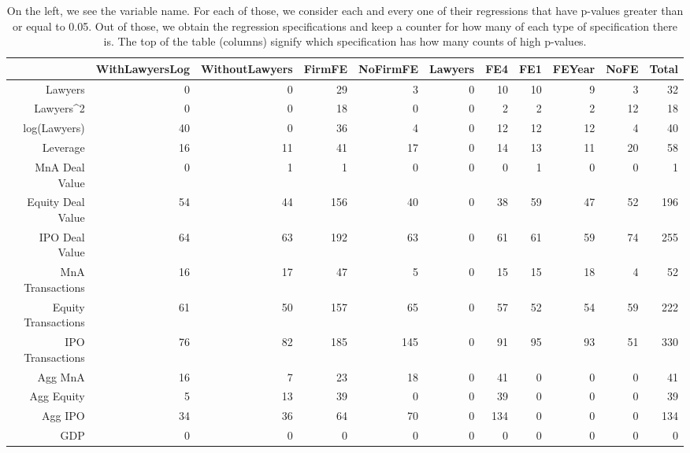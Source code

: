 \begin{table}[ht]
\centering
\begin{tabular}{rrrrrrrrrrr}
  \hline
 & WithLawyersLog & WithoutLawyers & FirmFE & NoFirmFE & Lawyers & FE4 & FE1 & FEYear & NoFE & \textbf{Total} \\ 
  \hline
Lawyers & 0 & 0 & 29 & 3 & 0 & 10 & 10 & 9 & 3 & 32 \\ 
  Lawyers^2 & 0 & 0 & 18 & 0 & 0 & 2 & 2 & 2 & 12 & 18 \\ 
  log(Lawyers) & 40 & 0 & 36 & 4 & 0 & 12 & 12 & 12 & 4 & 40 \\ 
  Leverage & 16 & 11 & 41 & 17 & 0 & 14 & 13 & 11 & 20 & 58 \\ 
  MnA Deal Value & 0 & 1 & 1 & 0 & 0 & 0 & 1 & 0 & 0 & 1 \\ 
  Equity Deal Value & 54 & 44 & 156 & 40 & 0 & 38 & 59 & 47 & 52 & 196 \\ 
  IPO Deal Value & 64 & 63 & 192 & 63 & 0 & 61 & 61 & 59 & 74 & 255 \\ 
  MnA Transactions & 16 & 17 & 47 & 5 & 0 & 15 & 15 & 18 & 4 & 52 \\ 
  Equity Transactions & 61 & 50 & 157 & 65 & 0 & 57 & 52 & 54 & 59 & 222 \\ 
  IPO Transactions & 76 & 82 & 185 & 145 & 0 & 91 & 95 & 93 & 51 & 330 \\ 
  Agg MnA & 16 & 7 & 23 & 18 & 0 & 41 & 0 & 0 & 0 & 41 \\ 
  Agg Equity & 5 & 13 & 39 & 0 & 0 & 39 & 0 & 0 & 0 & 39 \\ 
  Agg IPO & 34 & 36 & 64 & 70 & 0 & 134 & 0 & 0 & 0 & 134 \\ 
  GDP & 0 & 0 & 0 & 0 & 0 & 0 & 0 & 0 & 0 & 0 \\ 
   \hline
\end{tabular}
\caption{On the left, we see the variable name. For each of those, we consider each and every one of their regressions
  that have p-values greater than or equal to 0.05. Out of those, we obtain the regression specifications and keep a counter
  for how many of each type of specification there is. The top of the table (columns) signify which specification has how many counts of high p-values.} 
\end{table}
